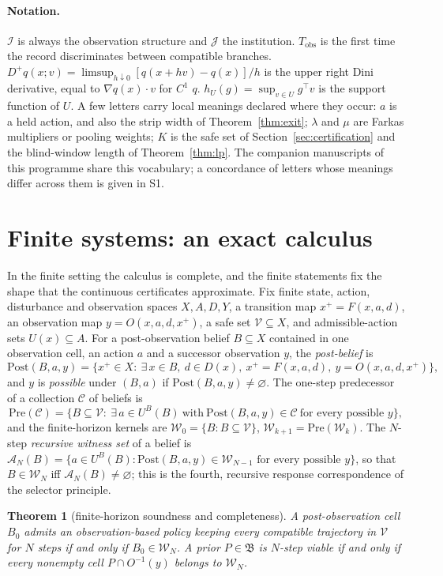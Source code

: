 \documentclass[11pt,a4paper]{article}
\theoremstyle{plain}
\newtheorem{theorem}{Theorem}[section]
\theoremstyle{definition}
\theoremstyle{remark}
\newcommand{\cV}{\mathcal{V}}
\newcommand{\cI}{\mathcal{I}}
\newcommand{\cJ}{\mathcal{J}}
\newcommand{\cA}{\mathcal{A}}
\newcommand{\cW}{\mathcal{W}}
\newcommand{\Post}{\mathrm{Post}}
\newcommand{\Pre}{\mathrm{Pre}}
\newcommand{\Tobs}{T_{\mathrm{obs}}}
\begin{document}
\paragraph{Notation.} $\cI$ is always the observation structure and $\cJ$ the institution. $\Tobs$ is the first time the record discriminates between compatible branches. $D^+q(x;v)=\limsup_{h\downarrow0}[q(x+hv)-q(x)]/h$ is the upper right Dini derivative, equal to $\nabla q(x)\cdot v$ for $C^1$ $q$. $h_U(g)=\sup_{v\in U}g^\top v$ is the support function of $U$. A few letters carry local meanings declared where they occur: $a$ is a held action, and also the strip width of Theorem~\ref{thm:exit}; $\lambda$ and $\mu$ are Farkas multipliers or pooling weights; $K$ is the safe set of Section~\ref{sec:certification} and the blind-window length of Theorem~\ref{thm:lp}. The companion manuscripts of this programme share this vocabulary; a concordance of letters whose meanings differ across them is given in S1.
\section{Finite systems: an exact calculus}\label{sec:finite}

In the finite setting the calculus is complete, and the finite statements fix the shape that the continuous certificates approximate. Fix finite state, action, disturbance and observation spaces $X,A,D,Y$, a transition map $x^+=F(x,a,d)$, an observation map $y=O(x,a,d,x^+)$, a safe set $\cV\subseteq X$, and admissible-action sets $U(x)\subseteq A$. For a post-observation belief $B\subseteq X$ contained in one observation cell, an action $a$ and a successor observation $y$, the \emph{post-belief} is
\[
\Post(B,a,y)=\bigl\{x^+\in X:\ \exists\,x\in B,\ d\in D(x),\ x^+=F(x,a,d),\ y=O(x,a,d,x^+)\bigr\},
\]
and $y$ is \emph{possible} under $(B,a)$ if $\Post(B,a,y)\ne\varnothing$. The one-step predecessor of a collection $\mathcal C$ of beliefs is
\[
\Pre(\mathcal C)=\bigl\{B\subseteq\cV:\ \exists\,a\in U^B(B)\ \text{with}\ \Post(B,a,y)\in\mathcal C\ \text{for every possible }y\bigr\},
\]
and the finite-horizon kernels are $\cW_0=\{B:B\subseteq\cV\}$, $\cW_{k+1}=\Pre(\cW_k)$. The $N$-step \emph{recursive witness set} of a belief is $\cA_N(B)=\{a\in U^B(B):\Post(B,a,y)\in\cW_{N-1}\text{ for every possible }y\}$, so that $B\in\cW_N$ iff $\cA_N(B)\ne\varnothing$; this is the fourth, recursive response correspondence of the selector principle.

\begin{theorem}[finite-horizon soundness and completeness]\label{thm:finite-horizon}
A post-observation cell $B_0$ admits an observation-based policy keeping every compatible trajectory in $\cV$ for $N$ steps if and only if $B_0\in\cW_N$. A prior $P\in\mathfrak B$ is $N$-step viable if and only if every nonempty cell $P\cap O^{-1}(y)$ belongs to $\cW_N$.
\end{theorem}
\end{document}
